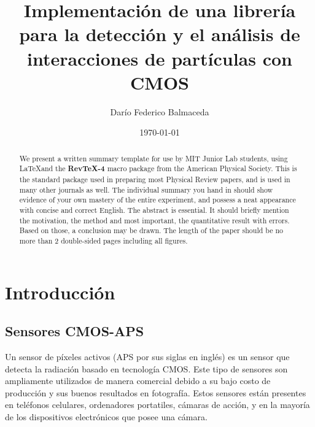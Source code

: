     
    
    \title{Implementación de una librería para la detección y el análisis de interacciones de partículas con CMOS}
    \author         {Darío Federico Balmaceda}
    \date{\today}
    
    \begin{abstract}
    We present a written summary template for use by MIT Junior Lab
    students, using \LaTeX and the {\bf RevTeX-4} macro package from the
    American Physical Society.  This is the standard package used in
    preparing most Physical Review papers, and is used in many other
    journals as well.  The individual summary you hand in should show
    evidence of your own mastery of the entire experiment, and possess a
    neat appearance with concise and correct English.  The abstract is
    essential.  It should briefly mention the motivation, the method and
    most important, the quantitative result with errors.  Based on those,
    a conclusion may be drawn.  The length of the paper should be no more
    than 2 double-sided pages including all figures.
    \end{abstract}
    
    \maketitle
    

    \section{Introducción}

    \subsection{Sensores CMOS-APS}
    Un sensor de píxeles activos (APS por sus siglas en inglés) es un sensor que detecta la radiación basado en tecnología CMOS.
    Este tipo de sensores son ampliamente utilizados de manera comercial debido a su
    bajo costo de producción y sus buenos resultados en fotografía.
    Estos sensores están presentes en teléfonos celulares, ordenadores portatiles, cámaras de acción,
    y en la mayoría de los dispositivos electrónicos que posee una cámara.

